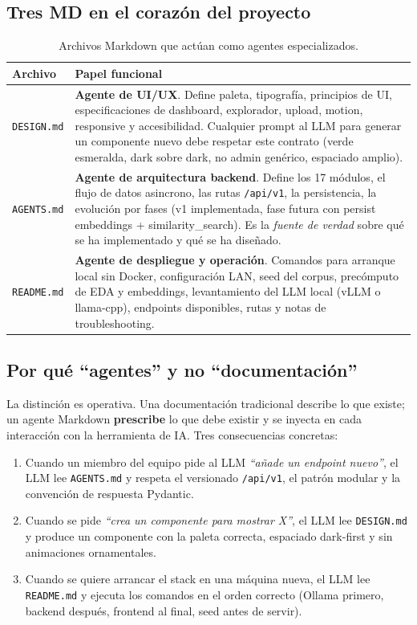 \documentclass[11pt,a4paper]{article}
\newcommand{\file}[1]{\texttt{\small #1}}
\begin{document}
\subsection{Tres MD en el corazón del proyecto}

\begin{table}[h]
\centering\small
\begin{tabularx}{\linewidth}{l X}
\toprule
\textbf{Archivo} & \textbf{Papel funcional} \\
\midrule
\file{DESIGN.md} & \textbf{Agente de UI/UX}. Define paleta, tipografía, principios de UI, especificaciones de dashboard, explorador, upload, motion, responsive y accesibilidad. Cualquier prompt al LLM para generar un componente nuevo debe respetar este contrato (verde esmeralda, dark sobre dark, no admin genérico, espaciado amplio). \\
\file{AGENTS.md} & \textbf{Agente de arquitectura backend}. Define los 17 módulos, el flujo de datos asincrono, las rutas \texttt{/api/v1}, la persistencia, la evolución por fases (v1 implementada, fase futura con persist embeddings + similarity\_search). Es la \emph{fuente de verdad} sobre qué se ha implementado y qué se ha diseñado. \\
\file{README.md} & \textbf{Agente de despliegue y operación}. Comandos para arranque local sin Docker, configuración LAN, seed del corpus, precómputo de EDA y embeddings, levantamiento del LLM local (vLLM o llama-cpp), endpoints disponibles, rutas y notas de troubleshooting. \\
\bottomrule
\end{tabularx}
\caption{Archivos Markdown que actúan como agentes especializados.}
\end{table}

\subsection{Por qué ``agentes'' y no ``documentación''}

La distinción es operativa. Una documentación tradicional describe lo que existe; un agente Markdown \textbf{prescribe} lo que debe existir y se inyecta en cada interacción con la herramienta de IA. Tres consecuencias concretas:

\begin{enumerate}
\item Cuando un miembro del equipo pide al LLM \emph{``añade un endpoint nuevo''}, el LLM lee \file{AGENTS.md} y respeta el versionado \texttt{/api/v1}, el patrón modular y la convención de respuesta Pydantic.
\item Cuando se pide \emph{``crea un componente para mostrar X''}, el LLM lee \file{DESIGN.md} y produce un componente con la paleta correcta, espaciado dark-first y sin animaciones ornamentales.
\item Cuando se quiere arrancar el stack en una máquina nueva, el LLM lee \file{README.md} y ejecuta los comandos en el orden correcto (Ollama primero, backend después, frontend al final, seed antes de servir).
\end{enumerate}
\end{document}
